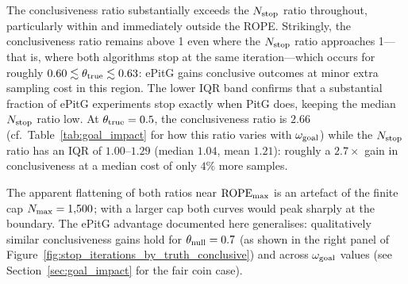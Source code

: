 The conclusiveness ratio substantially exceeds the $N_{\rm stop}$ ratio throughout,
particularly within and immediately outside the ROPE. Strikingly, the conclusiveness
ratio remains above 1 even where the $N_{\rm stop}$ ratio approaches 1---that is, where
both algorithms stop at the same iteration---which occurs for roughly
$0.60 \lesssim \theta_{\rm true} \lesssim 0.63$: ePitG gains conclusive outcomes at minor
extra sampling cost in this region. The lower IQR band confirms that a substantial
fraction of ePitG experiments stop exactly when PitG does, keeping the median
$N_{\rm stop}$ ratio low. At $\theta_{\rm true}=0.5$, the conclusiveness ratio is
$2.66$ (cf.\ Table~\ref{tab:goal_impact} for how this ratio varies with $\omega_{\rm goal}$)
while the $N_{\rm stop}$ ratio has an IQR of $1.00$--$1.29$ (median $1.04$,
mean $1.21$): roughly a $2.7\times$ gain in conclusiveness at a median cost of only
$4\%$ more samples.

The apparent flattening of both ratios near ${\rm ROPE}_{\rm max}$ is an artefact of
the finite cap $N_{\rm max}=1{,}500$; with a larger cap both curves would peak sharply
at the boundary.
The ePitG advantage documented here generalises: qualitatively similar conclusiveness
gains hold for $\theta_{\rm null}=0.7$ (as shown in the right panel of
Figure~\ref{fig:stop_iterations_by_truth_conclusive}) and across $\omega_{\rm goal}$
values (see Section~\ref{sec:goal_impact} for the fair coin case).
